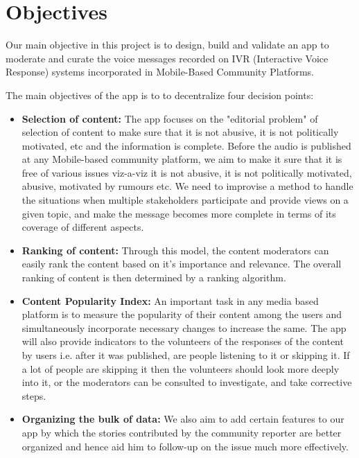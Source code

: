 \documentclass[11pt]{article}
\begin{document}
	\section{Objectives}
	Our main objective in this project is to design, build and validate an app to moderate and curate the voice messages recorded on IVR (Interactive Voice Response) systems incorporated in Mobile-Based Community Platforms.

    The main objectives of the app is to to decentralize four decision points:
     \begin{itemize}
				\item
				        \textbf{Selection of content: } The app focuses on the "editorial problem" of selection of content to make sure that it is not abusive, it is not politically motivated, etc and the information is complete. Before the audio is published at any Mobile-based community platform, we aim to make it sure that it is free of various issues viz-a-viz it is not abusive, it is not politically motivated, abusive, motivated by rumours etc. We need to improvise a method to handle the situations when multiple stakeholders participate and provide views on a given topic, and make the message becomes more complete in terms of its coverage of different aspects.
				\item
				        \textbf{Ranking of content: } Through this model, the content moderators can easily rank the content based on it’s importance and relevance. The overall ranking of content is then determined by a ranking algorithm.
				        
				\item  \textbf{Content Popularity Index: } An important task in any media based platform is to measure the popularity of their content among the users and simultaneously incorporate necessary changes to increase the same. The app will also provide indicators to the volunteers of the responses of the content by users i.e. after it was published, are people listening to it or skipping it. If a lot of people are skipping it then the volunteers should look more deeply into it, or the moderators can be consulted to investigate, and take corrective steps.
				\item \textbf{Organizing the bulk of data: } We  also  aim  to  add  certain  features  to  our  app  by  which  the  stories  contributed  by the community reporter are better organized and hence aid him to follow-up on the issue much more effectively.
			\end{itemize}
\end{document}
